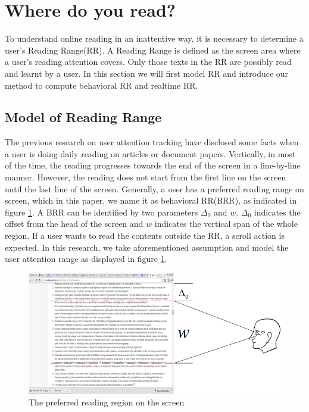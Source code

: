 \documentclass{sigchi}
\begin{document}
\section{Where do you read?}
To understand  online reading in an inattentive way, it is necessary to determine a user's Reading Range(RR). A Reading Range is defined as
the screen area where a user's reading attention covers. Only those texts in the  RR are possibly read and learnt by a user. In this section we 
will first model RR and introduce our method to compute behavioral RR and realtime RR.


\subsection{Model of Reading Range}

The previous research on user attention tracking \cite{buscher2010eye} have disclosed some facts when a user is doing daily reading on 
articles or document papers. Vertically, in most of the time, the reading progresses towards the end of the screen  in a line-by-line manner. 
However, the reading does not start from the first line on the screen until the last line of the screen. Generally, a user has a preferred reading range on screen, which in this paper, 
we name it as behavioral RR(BRR), as indicated in figure \ref{fig:read_region}. A BRR can be identified by two parameters $\Delta_0$ and $w$. $\Delta_0$  indicates the 
offset from the head of the screen and $w$ indicates the vertical span of the whole region. If a user wants to read the contents outside the RR,
a scroll action is expected. In this research, we take aforementioned assumption and model the user attention range as displayed in figure \ref{fig:read_region}. 


\begin{figure}[!h]
\centering
\includegraphics[width=1.0\columnwidth]{pictures/preferred_reigon}
\caption{The preferred reading region on the screen}
\label{fig:read_region}
\end{figure}
\end{document}
